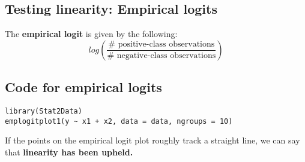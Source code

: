 \documentclass[titlepage, 12pt, leqno]{article}
\begin{document}
\subsection{Testing linearity: Empirical logits}
\begin{definition}
    The \textbf{empirical logit} is given by the following:
    \[
        log\left(\frac{\# \text{ positive-class observations}}
        {\# \text{ negative-class observations}}\right)
    \]
\end{definition}

\subsection{Code for empirical logits}
\begin{verbatim}
library(Stat2Data)
emplogitplot1(y ~ x1 + x2, data = data, ngroups = 10)
\end{verbatim}

If the points on the empirical logit plot roughly track a straight line, we can
say that \textbf{linearity has been upheld.}
\end{document}
